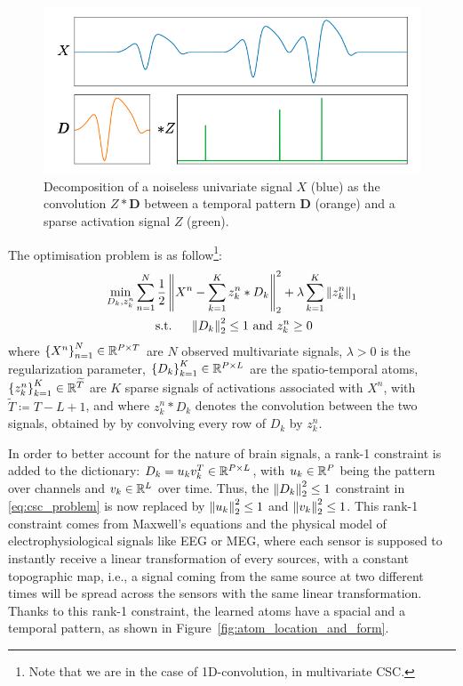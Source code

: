 \begin{figure}[h!]
    \centering
    \includegraphics[scale=0.5]{pics/atom_decomposition.png}
    \caption{Decomposition of a noiseless univariate signal $X$ (blue) as the convolution $Z * \boldsymbol{D}$ between a temporal pattern $\boldsymbol{D}$ (orange) and a sparse activation signal $Z$ (green).}
    \label{fig:signal_decomposition}
\end{figure}

The optimisation problem is as follow\footnote{Note that we are in the case of 1D-convolution, in multivariate CSC.}:
\begin{equation}\label{eq:csc_problem}
\begin{gathered}
\min _{D_{k}, z_{k}^{n}} \sum_{n=1}^{N} \frac{1}{2}\left\Vert X^{n}-\sum_{k=1}^{K} z_{k}^{n} * D_{k}\right\Vert_{2}^{2}+\lambda \sum_{k=1}^{K}\left\Vert z_{k}^{n}\right\Vert_{1} \\
\text { s.t. } \quad \left\Vert D_{k}\right\Vert_{2}^{2} \leq 1 \text { and } z_{k}^{n} \geq 0
\end{gathered}
\end{equation}
where $\left\lbrace X^n \right\rbrace_{n=1}^N \in \mathbb{R}^{P\times T}$ are $N$ observed multivariate signals, $\lambda > 0$ is the regularization parameter, $\left\lbrace D_k \right\rbrace_{k=1}^K \in \mathbb{R}^{P\times L}$ are the spatio-temporal atoms, $\left\lbrace z_k^n \right\rbrace_{k=1}^K \in \mathbb{R}^{\widetilde{T}}$ are $K$ sparse signals of activations associated with $X^n$, with $\widetilde{T} \coloneqq T - L + 1$, and where $z_{k}^{n} * D_{k}$ denotes the convolution between the two signals, obtained by by convolving every row of $D_k$ by $z_k^n$.

In order to better account for the nature of brain signals, a rank-1 constraint is added to the dictionary: $D_k = u_k v_k^T \in \mathbb{R}^{P\times L}$, with $u_k \in \mathbb{R}^P$ being the pattern over channels and $v_k \in \mathbb{R}^L$ over time.
Thus, the $\left\Vert D_{k}\right\Vert_{2}^{2} \leq 1$ constraint in \eqref{eq:csc_problem} is now replaced by $\left\Vert u_{k}\right\Vert_{2}^{2} \leq 1$ and $\left\Vert v_{k}\right\Vert_{2}^{2} \leq 1$.
This rank-1 constraint comes from Maxwell's equations and the physical model of electrophysiological signals like EEG or MEG, where each sensor is supposed to instantly receive a linear transformation of every sources, with a constant topographic map, i.e., a signal coming from the same source at two different times will be spread across the sensors with the same linear transformation.
Thanks to this rank-1 constraint, the learned atoms have a spacial and a temporal pattern, as shown in Figure~\ref{fig:atom_location_and_form}.

